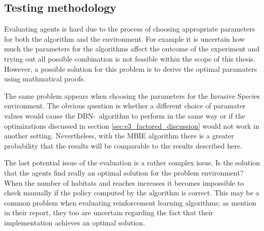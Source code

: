 \subsection{Testing methodology}

Evaluating agents is hard due to the process of choosing appropriate parameters
for both the algorithm and the environment. For example it is uncertain how
much the parameters for the algorithms affect the outcome of the experiment and
trying out all possible combination is not feasible within the scope of this
thesis. However, a possible solution for this problem is to derive the optimal
paramaters using mathmatical proofs.

The same problem appears when choosing the parameters for the Invasive Species
environment. The obvious question is whether a different choice of paramater values 
would cause the DBN-\etre\ algorithm to perform in the same way or if the optimizations
discussed in section \ref{sec:e3_factored_discussion} would not work in
another setting. Nevertheless, with the MBIE algorithm there is a greater
probability that the results will be comparable to the results described here.

The last potential issue of the evaluation is a rather complex issue. Is the solution that the agents find really an optimal solution for the problem environment? When the number of habitats and reaches increases it becomes impossible to check manually if the policy computed by the algorithm is correct. This may be a common problem when evaluating reinforcement learning algorithms; as \textcite{dietterich2013pac} mention in their report, they too are uncertain regarding the fact that their implementation achieves an optimal solution. 

